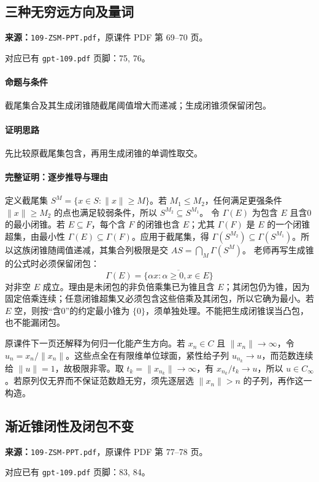 \clearpage\subsection{三种无穷远方向及量词}
\textbf{来源：}\texttt{109-ZSM-PPT.pdf}，原课件 PDF 第 69--70 页。\par
对应已有 \texttt{gpt-109.pdf} 页脚：75, 76。\par
\paragraph{命题与条件}截尾集合及其生成闭锥随截尾阈值增大而递减；生成闭锥须保留闭包。
\paragraph{证明思路}先比较原截尾集包含，再用生成闭锥的单调性取交。
\paragraph{完整证明：逐步推导与理由}

定义截尾集 $S^M=\{x\in S:\|x\|\ge M\}$。若 $M_1\le M_2$，任何满足更强条件 $\|x\|\ge M_2$ 的点也满足较弱条件，所以 $S^{M_2}\subseteq S^{M_1}$。
令 $\Gamma(E)$ 为包含 $E$ 且含0的最小闭锥。若 $E\subseteq F$，每个含 $F$ 的闭锥也含 $E$；尤其 $\Gamma(F)$ 是 $E$ 的一个闭锥超集，由最小性 $\Gamma(E)\subseteq\Gamma(F)$。应用于截尾集，得 $\Gamma(S^{M_2})\subseteq\Gamma(S^{M_1})$。所以这族闭锥随阈值递减，其集合列极限是交 $A S=\bigcap_M\Gamma(S^M)$。
老师再写生成锥的公式时必须保留闭包：
\[\Gamma(E)=\overline{\{\alpha x:\alpha\ge0,x\in E\}}\]
对非空 $E$ 成立。理由是未闭包的非负倍乘集已为锥且含 $E$；其闭包仍为锥，因为固定倍乘连续；任意闭锥超集又必须包含这些倍乘及其闭包，所以它确为最小。若 $E$ 空，则按“含0”的约定最小锥为 $\{0\}$，须单独处理。不能把生成闭锥误当凸包，也不能漏闭包。

原课件下一页还解释为何归一化能产生方向。若 $x_n\in C$ 且 $\|x_n\|\to\infty$，令 $u_n=x_n/\|x_n\|$。这些点全在有限维单位球面，紧性给子列 $u_{n_k}\to u$，而范数连续给 $\|u\|=1$，故极限非零。取 $t_k=\|x_{n_k}\|\to\infty$，有 $x_{n_k}/t_k\to u$，所以 $u\in C_\infty$。若原列仅无界而不保证范数趋无穷，须先逐层选 $\|x_n\|>n$ 的子列，再作这一构造。

\clearpage\subsection{渐近锥闭性及闭包不变}
\textbf{来源：}\texttt{109-ZSM-PPT.pdf}，原课件 PDF 第 77--78 页。\par
对应已有 \texttt{gpt-109.pdf} 页脚：83, 84。\par
